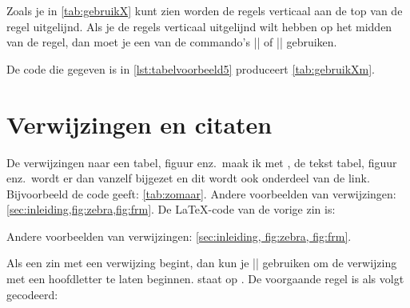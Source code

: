 Zoals je in \cref{tab:gebruikX} kunt zien worden de regels verticaal aan de top van de regel uitgelijnd.
Als je de regels verticaal uitgelijnd wilt hebben op het midden van de regel, dan moet je een van de commando's |\tabelXm| of |\langetabelXm| gebruiken.

De code die gegeven is in \cref{lst:tabelvoorbeeld5} produceert \cref{tab:gebruikXm}.



\section{Verwijzingen en citaten}
\label{sec:verwijzingen}
De verwijzingen naar een tabel, figuur enz.\ maak ik met , de tekst tabel, figuur enz.\ wordt er dan vanzelf bijgezet en dit wordt ook onderdeel van de link.
Bijvoorbeeld de code  geeft: \cref{tab:zomaar}.
Andere voorbeelden van verwijzingen: \cref{sec:inleiding,fig:zebra,fig:frm}.
De \LaTeX{}-code van de vorige zin is:

\begin{lstfragment}[style = lstyle, alsoletter = :, emph={sec:inleiding, fig:zebra, fig:frm}, emphstyle=\lstllabel]
Andere voorbeelden van verwijzingen: \cref{sec:inleiding, fig:zebra, fig:frm}.
\end{lstfragment}

Als een zin met een verwijzing begint, dan kun je |\Cref| gebruiken om de verwijzing met een hoofdletter te laten beginnen.
 staat op .
De voorgaande regel is als volgt gecodeerd:

